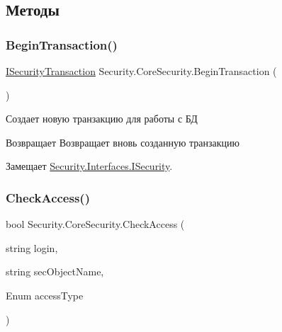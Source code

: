 \subsection{Методы}
\mbox{\label{class_security_1_1_core_security_a7dd6592ac290133f4f0182cfef41547b}} 
\subsubsection{\texorpdfstring{Begin\+Transaction()}{BeginTransaction()}}
{\footnotesize\ttfamily \hyperlink{interface_security_1_1_interfaces_1_1_i_security_transaction}{I\+Security\+Transaction} Security.\+Core\+Security.\+Begin\+Transaction (\begin{DoxyParamCaption}{ }\end{DoxyParamCaption})}



Создает новую транзакцию для работы с БД 

\begin{DoxyReturn}{Возвращает}
Возвращает вновь созданную транзакцию
\end{DoxyReturn}


Замещает \hyperlink{interface_security_1_1_interfaces_1_1_i_security_aaa904347683f2b6cac529738094112e1}{Security.\+Interfaces.\+I\+Security}.

\mbox{\label{class_security_1_1_core_security_a8210ce9453e545a46048a95b1e35837e}} 
\subsubsection{\texorpdfstring{Check\+Access()}{CheckAccess()}\hspace{0.1cm}{\footnotesize\ttfamily [1/4]}}
{\footnotesize\ttfamily bool Security.\+Core\+Security.\+Check\+Access (\begin{DoxyParamCaption}\item[{string}]{login,  }\item[{string}]{sec\+Object\+Name,  }\item[{Enum}]{access\+Type }\end{DoxyParamCaption})}



